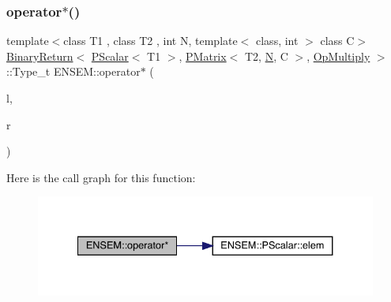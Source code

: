 \subsubsection{\texorpdfstring{operator$\ast$()}{operator*()}\hspace{0.1cm}{\footnotesize\ttfamily [2/3]}}
{\footnotesize\ttfamily template$<$class T1 , class T2 , int N, template$<$ class, int $>$ class C$>$ \\
\mbox{\hyperlink{structENSEM_1_1BinaryReturn}{Binary\+Return}}$<$ \mbox{\hyperlink{classENSEM_1_1PScalar}{P\+Scalar}}$<$ T1 $>$, \mbox{\hyperlink{classENSEM_1_1PMatrix}{P\+Matrix}}$<$ T2, \mbox{\hyperlink{operator__name__util_8cc_a7722c8ecbb62d99aee7ce68b1752f337}{N}}, C $>$, \mbox{\hyperlink{structENSEM_1_1OpMultiply}{Op\+Multiply}} $>$\+::Type\+\_\+t E\+N\+S\+E\+M\+::operator$\ast$ (\begin{DoxyParamCaption}\item[{const \mbox{\hyperlink{classENSEM_1_1PScalar}{P\+Scalar}}$<$ T1 $>$ \&}]{l,  }\item[{const \mbox{\hyperlink{classENSEM_1_1PMatrix}{P\+Matrix}}$<$ T2, \mbox{\hyperlink{operator__name__util_8cc_a7722c8ecbb62d99aee7ce68b1752f337}{N}}, C $>$ \&}]{r }\end{DoxyParamCaption})\hspace{0.3cm}{\ttfamily [inline]}}

Here is the call graph for this function\+:\nopagebreak
\begin{figure}[H]
\begin{center}
\leavevmode
\includegraphics[width=334pt]{df/d0a/group__primmatrix_ga2f9521924540b40d00ad4aa1606bfb22_cgraph}
\end{center}
\end{figure}
\mbox{\label{group__primmatrix_ga8f46104c9d9d10301141fdd1c0546a36}} 
